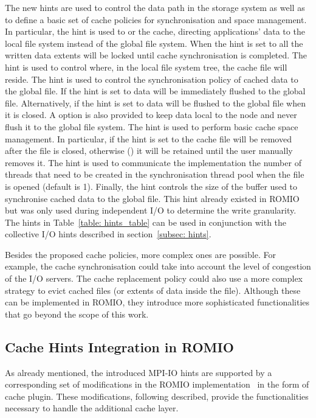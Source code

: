 The new hints are used to control the data path in the storage system as well as to define a basic set of cache policies for synchronisation and space management. In particular, the  hint is used to  or  the cache, directing applications' data to the local file system instead of the global file system. When the hint is set to  all the written data extents will be locked until cache synchronisation is completed. The  hint is used to control where, in the local file system tree, the cache file will reside. The  hint is used to control the synchronisation policy of cached data to the global file. If the hint is set to  data will be immediately flushed to the global file. Alternatively, if the hint is set to  data will be flushed to the global file when it is closed. A  option is also provided to keep data local to the node and never flush it to the global file system. The  hint is used to perform basic cache space management. In particular, if the hint is set to  the cache file will be removed after the file is closed, otherwise () it will be retained until the user manually removes it. The  hint is used to communicate the implementation the number of threads that need to be created in the synchronisation thread pool when the file is opened (default is 1). Finally, the  hint controls the size of the buffer used to synchronise cached data to the global file. This hint already existed in ROMIO but was only used during independent I/O to determine the write granularity. The hints in Table~\ref{table: hints_table} can be used in conjunction with the collective I/O hints described in section~\ref{subsec: hints}.

Besides the proposed cache policies, more complex ones are possible. For example, the cache synchronisation could take into account the level of congestion of the I/O servers. The cache replacement policy could also use a more complex strategy to evict cached files (or extents of data inside the file). Although these can be implemented in ROMIO, they introduce more sophisticated functionalities that go beyond the scope of this work.

\subsection{Cache Hints Integration in ROMIO}
\label{subsec: support}
As already mentioned, the introduced MPI-IO hints are supported by a corresponding set of modifications in the ROMIO implementation~\cite{E10-DEEPER} in the form of cache plugin. These modifications, following described, provide the functionalities necessary to handle the additional cache layer.

